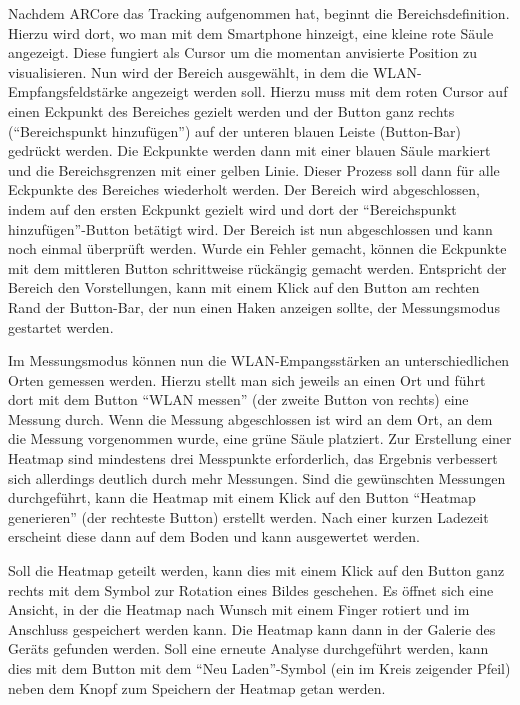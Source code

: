 \documentclass[10pt]{scrartcl}
\begin{document}
Nachdem ARCore das Tracking aufgenommen hat, beginnt die Bereichsdefinition. Hierzu wird dort, wo man mit dem Smartphone hinzeigt, eine kleine rote Säule angezeigt. Diese fungiert als Cursor um die momentan anvisierte Position zu visualisieren. Nun wird der Bereich ausgewählt, in dem die WLAN-Empfangsfeldstärke angezeigt werden soll. Hierzu muss mit dem roten Cursor auf einen Eckpunkt des Bereiches gezielt werden und der Button ganz rechts (\enquote{Bereichspunkt hinzufügen}) auf der unteren blauen Leiste (Button-Bar) gedrückt werden. Die Eckpunkte werden dann mit einer blauen Säule markiert und die Bereichsgrenzen mit einer gelben Linie. Dieser Prozess soll dann für alle Eckpunkte des Bereiches wiederholt werden. Der Bereich wird abgeschlossen, indem auf den ersten Eckpunkt gezielt wird und dort der \enquote{Bereichspunkt hinzufügen}-Button betätigt wird. Der Bereich ist nun abgeschlossen und kann noch einmal überprüft werden. Wurde ein Fehler gemacht, können die Eckpunkte mit dem mittleren Button schrittweise rückängig gemacht werden. Entspricht der Bereich den Vorstellungen, kann mit einem Klick auf den Button am rechten Rand der Button-Bar, der nun einen Haken anzeigen sollte, der Messungsmodus gestartet werden.

Im Messungsmodus können nun die WLAN-Empangsstärken an unterschiedlichen Orten gemessen werden. Hierzu stellt man sich jeweils an einen Ort und führt dort mit dem Button \enquote{WLAN messen} (der zweite Button von rechts) eine Messung durch. Wenn die Messung abgeschlossen ist wird an dem Ort, an dem die Messung vorgenommen wurde, eine grüne Säule platziert. Zur Erstellung einer Heatmap sind mindestens drei Messpunkte erforderlich, das Ergebnis verbessert sich allerdings deutlich durch mehr Messungen. Sind die gewünschten Messungen durchgeführt, kann die Heatmap mit einem Klick auf den Button \enquote{Heatmap generieren} (der rechteste Button) erstellt werden. Nach einer kurzen Ladezeit erscheint diese dann auf dem Boden und kann ausgewertet werden.

Soll die Heatmap geteilt werden, kann dies mit einem Klick auf den Button ganz rechts mit dem Symbol zur Rotation eines Bildes geschehen. Es öffnet sich eine Ansicht, in der die Heatmap nach Wunsch mit einem Finger rotiert und im Anschluss gespeichert werden kann. Die Heatmap kann dann in der Galerie des Geräts gefunden werden. Soll eine erneute Analyse durchgeführt werden, kann dies mit dem Button mit dem \enquote{Neu Laden}-Symbol (ein im Kreis zeigender Pfeil) neben dem Knopf zum Speichern der Heatmap getan werden.
\end{document}
